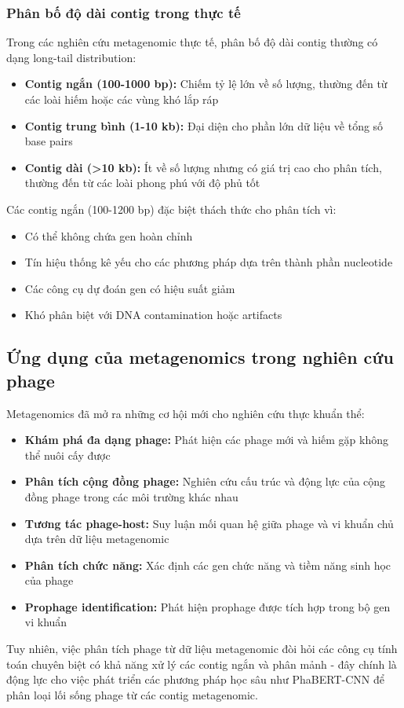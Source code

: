 \subsubsection{Phân bố độ dài contig trong thực tế}

Trong các nghiên cứu metagenomic thực tế, phân bố độ dài contig thường có dạng long-tail distribution:

\begin{itemize}
    \item \textbf{Contig ngắn (100-1000 bp):} Chiếm tỷ lệ lớn về số lượng, thường đến từ các loài hiếm hoặc các vùng khó lắp ráp

    \item \textbf{Contig trung bình (1-10 kb):} Đại diện cho phần lớn dữ liệu về tổng số base pairs

    \item \textbf{Contig dài (>10 kb):} Ít về số lượng nhưng có giá trị cao cho phân tích, thường đến từ các loài phong phú với độ phủ tốt
\end{itemize}

Các contig ngắn (100-1200 bp) đặc biệt thách thức cho phân tích vì:
\begin{itemize}
    \item Có thể không chứa gen hoàn chỉnh
    \item Tín hiệu thống kê yếu cho các phương pháp dựa trên thành phần nucleotide
    \item Các công cụ dự đoán gen có hiệu suất giảm
    \item Khó phân biệt với DNA contamination hoặc artifacts
\end{itemize}

\subsection{Ứng dụng của metagenomics trong nghiên cứu phage}

Metagenomics đã mở ra những cơ hội mới cho nghiên cứu thực khuẩn thể:

\begin{itemize}
    \item \textbf{Khám phá đa dạng phage:} Phát hiện các phage mới và hiếm gặp không thể nuôi cấy được \cite{hayes2017metagenomic}

    \item \textbf{Phân tích cộng đồng phage:} Nghiên cứu cấu trúc và động lực của cộng đồng phage trong các môi trường khác nhau

    \item \textbf{Tương tác phage-host:} Suy luận mối quan hệ giữa phage và vi khuẩn chủ dựa trên dữ liệu metagenomic

    \item \textbf{Phân tích chức năng:} Xác định các gen chức năng và tiềm năng sinh học của phage

    \item \textbf{Prophage identification:} Phát hiện prophage được tích hợp trong bộ gen vi khuẩn
\end{itemize}

Tuy nhiên, việc phân tích phage từ dữ liệu metagenomic đòi hỏi các công cụ tính toán chuyên biệt có khả năng xử lý các contig ngắn và phân mảnh - đây chính là động lực cho việc phát triển các phương pháp học sâu như PhaBERT-CNN để phân loại lối sống phage từ các contig metagenomic.
